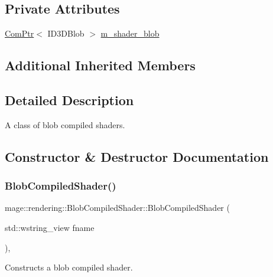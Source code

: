 \subsection*{Private Attributes}
\begin{DoxyCompactItemize}
\item 
\mbox{\hyperlink{namespacemage_ae74f374780900893caa5555d1031fd79}{Com\+Ptr}}$<$ I\+D3\+D\+Blob $>$ \mbox{\hyperlink{classmage_1_1rendering_1_1_blob_compiled_shader_ad28d77dc5fd97d127c2e2dc875384449}{m\+\_\+shader\+\_\+blob}}
\end{DoxyCompactItemize}
\subsection*{Additional Inherited Members}


\subsection{Detailed Description}
A class of blob compiled shaders. 

\subsection{Constructor \& Destructor Documentation}
\mbox{\label{classmage_1_1rendering_1_1_blob_compiled_shader_acc17022773372a6e6b709c198285b861}} 
\subsubsection{\texorpdfstring{Blob\+Compiled\+Shader()}{BlobCompiledShader()}\hspace{0.1cm}{\footnotesize\ttfamily [1/3]}}
{\footnotesize\ttfamily mage\+::rendering\+::\+Blob\+Compiled\+Shader\+::\+Blob\+Compiled\+Shader (\begin{DoxyParamCaption}\item[{std\+::wstring\+\_\+view}]{fname }\end{DoxyParamCaption})\hspace{0.3cm}{\ttfamily [explicit]}, {\ttfamily [noexcept]}}

Constructs a blob compiled shader.


